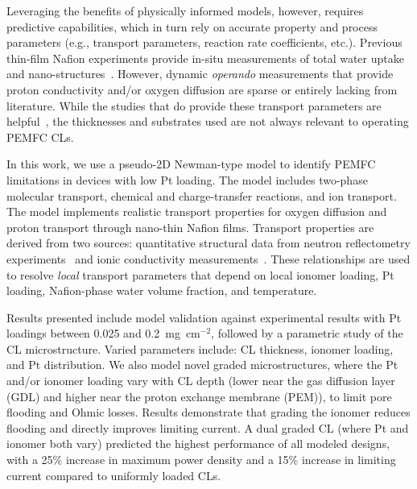 \documentclass[final,3p,times,twocolumn]{elsarticle}    %
\newcommand{\crr}[1]{\color{red} #1 \color{black}}
\begin{document}
Leveraging the benefits of physically informed models, however, requires predictive capabilities, which in turn rely on accurate property and process parameters (e.g., transport parameters, reaction rate coefficients, etc.). Previous thin-film Nafion experiments provide in-situ measurements of total water uptake~\cite{bib:kongkanand_2011, bib:bharath_2016, bib:dura_2009, bib:decaluwe_2018} and nano-structures~\cite{bib:dura_2009, bib:decaluwe_2018, bib:wood_2009, bib:peltonen_2021}. However, dynamic \emph{operando} measurements that provide proton conductivity and/or oxygen diffusion are sparse or entirely lacking from literature. While the studies that do provide these transport parameters are helpful~\cite{bib:chen_2019, bib:paul_mccreery_2014}, the thicknesses and substrates used are not always relevant to operating PEMFC CLs. 

In this work, we use a pseudo-2D Newman-type model to identify PEMFC limitations in devices with low Pt loading. The model includes two-phase molecular transport, chemical and charge-transfer reactions, and ion transport. The model implements realistic transport properties for oxygen diffusion and proton transport through nano-thin Nafion films. Transport properties are derived from two sources: quantitative structural data from neutron reflectometry experiments~\cite{bib:decaluwe_2018} and ionic conductivity measurements~\cite{bib:paul_mccreery_2014}. \crr{These relationships are used to resolve \emph{local} transport parameters that depend on local ionomer loading, Pt loading, Nafion-phase water volume fraction, and temperature.} 

Results presented include model validation against experimental results with Pt loadings between 0.025 and 0.2~mg~cm$^{-2}$, followed by a parametric study of the CL microstructure. Varied parameters include: CL thickness, ionomer loading, and Pt distribution. We also model novel graded microstructures, where the Pt and/or ionomer loading vary with CL depth (lower near the gas diffusion layer (GDL) and higher near the proton exchange membrane (PEM)), to limit pore flooding and Ohmic losses. Results demonstrate that grading the ionomer reduces flooding and directly improves limiting current. A dual graded CL (where Pt and ionomer both vary) predicted the highest performance of all modeled designs, with a 25\% increase in maximum power density and a 15\% increase in limiting current compared to uniformly loaded CLs.


\end{document}
